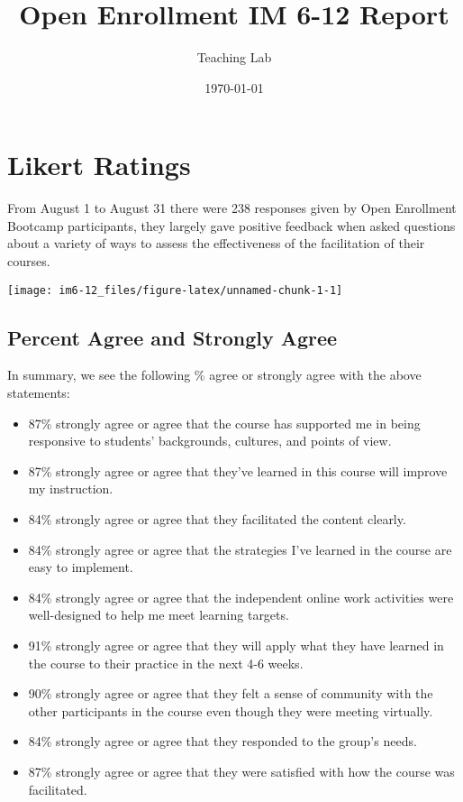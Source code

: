 \documentclass[10,a4paperpaper,]{article}
\title{Open Enrollment IM 6-12 Report}
\author{Teaching Lab}
\date{\today}
\begin{document}
\renewcommand{\contentsname}{Table of Contents}

\renewcommand{\pagename}{Page}


\maketitle
\tableofcontents
{}
\clearpage

\section{Likert Ratings}

From August 1 to August 31 there were 238 responses given by Open
Enrollment Bootcamp participants, they largely gave positive feedback
when asked questions about a variety of ways to assess the effectiveness
of the facilitation of their courses.

\begin{center}\texttt{[image: im6-12\_files/figure-latex/unnamed-chunk-1-1]} \end{center}

\subsection{Percent Agree and Strongly Agree}

In summary, we see the following \% agree or strongly agree with the
above statements:

\begin{itemize}
\tightlist
\item
  87\% strongly agree or agree that the course has supported me in being
  responsive to students' backgrounds, cultures, and points of view.
\item
  87\% strongly agree or agree that they've learned in this course will
  improve my instruction.
\item
  84\% strongly agree or agree that they facilitated the content
  clearly.
\item
  84\% strongly agree or agree that the strategies I've learned in the
  course are easy to implement.
\item
  84\% strongly agree or agree that the independent online work
  activities were well-designed to help me meet learning targets.
\item
  91\% strongly agree or agree that they will apply what they have
  learned in the course to their practice in the next 4-6 weeks.
\item
  90\% strongly agree or agree that they felt a sense of community with
  the other participants in the course even though they were meeting
  virtually.
\item
  84\% strongly agree or agree that they responded to the group's needs.
\item
  87\% strongly agree or agree that they were satisfied with how the
  course was facilitated.
\end{itemize}
\end{document}
